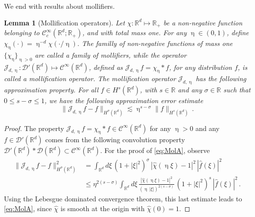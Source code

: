 \documentclass[11pt,reqno]{amsart}
\newtheorem{lemma}{Lemma}
\def \R{{\mathbb{R}}}
\begin{document}
We end with results about mollifiers.
\begin{lemma}[Mollification operators]
  \label{lem:Mollif}
  Let $\chi: \R^d \mapsto \R_+$ be a non-negative function belonging to $\mathscr{C}_c^\infty(\R^d;\R_+)$, and with total mass one. For any $\upeta \in (0,1)$,
  define $\chi_\upeta(\cdot)=\upeta^{-d}\chi(\cdot/\upeta)$. The familly of non-negative functions of mass one $\{\chi_\upeta \}_{\upeta>0}$ are called a family of mollifiers,
  while the operator $ \mathcal J_{d,\upeta} : \mathcal D'(\R^d) \mapsto \mathscr{C}^\infty(\R^d)$,
  defined as $\mathcal J_{d,\upeta} f= \chi_\upeta\ast f $, for any distribution $f$, is called a mollification operator. The mollification
  operator $\mathcal J_{d,\upeta}$ has the following approximation property.  For all  $f\in H^s(\R^d)$, with  $s \in\R$ and any $\sigma \in \R$ such that $0\leq  s-\sigma \leq 1$, we have
  the following approximation error estimate
  \begin{equation}
      \label{eq:MolA}
      \| \mathcal J_{d,\upeta} f -f\|_{H^\sigma(\R^d)} \lesssim\upeta^{s-\sigma}\| f\|_{H^s(\R^d)}\,.
 \end{equation}   
\end{lemma}

\begin{proof}  The property $\mathcal J_{d,\upeta} f= \chi_\upeta\ast f \in \mathscr{C}^\infty(\R^d)$ for any $\upeta >0$ and any $f\in \mathcal D'(\R^d)$ comes from the following  convolution property $\mathcal D'(\R^d) \ast \mathcal D(\R^d) \subset  \mathscr{C}^\infty(\R^d)$. For the proof of \eqref{eq:MolA}, observe
\begin{align*}  
 \| \mathcal J_{d,\upeta} f -f\|_{H^\sigma(\R^d)}^2& =\int_{\R^d} d\xi\, (1+|\xi |^2)^{\sigma} \, |\widehat{\chi}(\upeta \xi)-1|^2 \, |\hat f(\xi)|^2 \\
&\leq \eta^{2(s-\sigma)} \int_{\R^d} d\xi\,\frac{|\widehat{\chi}(\upeta \xi)-1|^2}{(\upeta \,  \vert \xi \vert)^{2(s-\sigma)}} \, (1+|\xi |^2)^{s} \, |\hat f(\xi)|^2\,.
\end{align*}
Using the Lebesgue dominated convergence theorem, 
this last estimate leads to \eqref{eq:MolA}, since $\widehat \chi$ is smooth at the origin with $\widehat \chi(0)=1$.
\end{proof}
\end{document}
